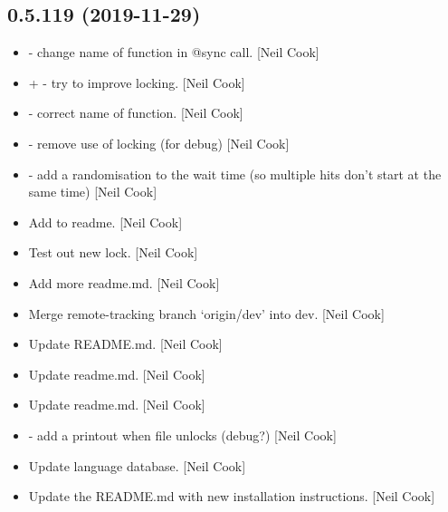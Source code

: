 \documentclass[a4paper,10pt,english]{report}
\begin{document}
\subsection{0.5.119 (2019-11-29)}
\label{\detokenize{misc/changelog:id24}}\begin{itemize}
\item {} 
 - change name of function in @sync call. {[}Neil Cook{]}

\item {} 
 +  - try to improve locking. {[}Neil Cook{]}

\item {} 
 - correct name of function. {[}Neil Cook{]}

\item {} 
 - remove use of locking (for debug) {[}Neil Cook{]}

\item {} 
 - add a randomisation to the wait time (so multiple
hits don’t start at the same time) {[}Neil Cook{]}

\item {} 
Add to readme. {[}Neil Cook{]}

\item {} 
Test out new lock. {[}Neil Cook{]}

\item {} 
Add more readme.md. {[}Neil Cook{]}

\item {} 
Merge remote-tracking branch ‘origin/dev’ into dev. {[}Neil Cook{]}

\item {} 
Update README.md. {[}Neil Cook{]}

\item {} 
Update readme.md. {[}Neil Cook{]}

\item {} 
Update readme.md. {[}Neil Cook{]}

\item {} 
 - add a printout when file unlocks (debug?) {[}Neil Cook{]}

\item {} 
Update language database. {[}Neil Cook{]}

\item {} 
Update the README.md with new installation instructions. {[}Neil Cook{]}


\end{itemize}
\end{document}
